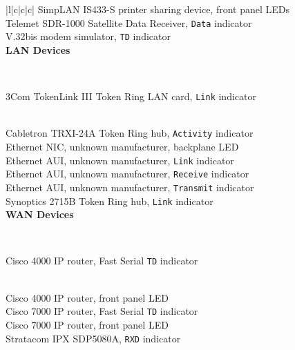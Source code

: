 \documentclass{acmtrans2e}
\begin{document}
\begin{table}
\begin{tabular}{|l|c|c|c|}
SimpLAN IS433-S printer sharing device, front panel LEDs \ClassThree \\

Telemet SDR-1000 Satellite Data Receiver, {\tt Data} indicator \ClassThree \\

V.32bis modem simulator, {\tt TD} indicator \ClassThree \\ [0.5ex]

\hline
{}
{\bf LAN Devices} \rule{0in}{2.5ex} \\ [0.5ex]

\hline

3Com TokenLink III Token Ring LAN card, {\tt Link} indicator \ClassOne
\rule{0in}{2.5ex} \\

Cabletron TRXI-24A Token Ring hub, {\tt Activity} indicator \ClassTwo \\

Ethernet NIC, unknown manufacturer, backplane LED \ClassOne \\

Ethernet AUI, unknown manufacturer, {\tt Link} indicator \ClassTwo \\

Ethernet AUI, unknown manufacturer, {\tt Receive} indicator \ClassTwo \\

Ethernet AUI, unknown manufacturer, {\tt Transmit} indicator \ClassTwo \\

Synoptics 2715B Token Ring hub, {\tt Link} indicator \ClassOne \\ [0.5ex]

\hline
{}
{\bf WAN Devices} \rule{0in}{2.5ex} \\ [0.5ex]

\hline

Cisco 4000 IP router, Fast Serial {\tt TD} indicator \ClassThree
\rule{0in}{2.5ex} \\

Cisco 4000 IP router, front panel LED \ClassTwo \\

Cisco 7000 IP router, Fast Serial {\tt TD} indicator \ClassThree \\

Cisco 7000 IP router, front panel LED \ClassTwo \\

Stratacom IPX SDP5080A, {\tt RXD} indicator \ClassTwo \\


\end{tabular}
\end{table}
\end{document}
